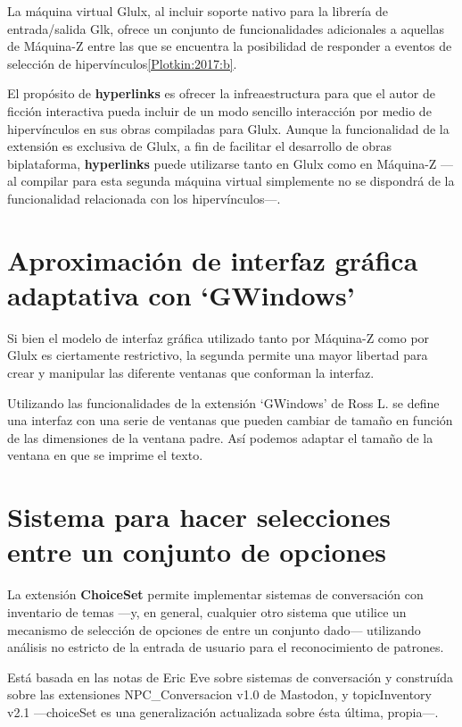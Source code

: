 La máquina virtual Glulx, al incluir soporte nativo para la librería de entrada/salida Glk, ofrece un conjunto de funcionalidades adicionales a aquellas de Máquina-Z entre las que se encuentra la posibilidad de responder a eventos de selección de hipervínculos\ref{Plotkin:2017:b}.

El propósito de \textbf{hyperlinks} es ofrecer la infreaestructura para que el autor de ficción interactiva pueda incluir de un modo sencillo interacción por medio de hipervínculos en sus obras compiladas para Glulx. Aunque la funcionalidad de la extensión es exclusiva de Glulx, a fin de facilitar el desarrollo de obras biplataforma, \textbf{hyperlinks} puede utilizarse tanto en Glulx como en Máquina-Z ---al compilar para esta segunda máquina virtual simplemente no se dispondrá de la funcionalidad relacionada con los hipervínculos---.


\section{Aproximación de interfaz gráfica adaptativa con `GWindows'}

Si bien el modelo de interfaz gráfica utilizado tanto por Máquina-Z como por Glulx es ciertamente restrictivo, la segunda permite una mayor libertad para crear y manipular las diferente ventanas que conforman la interfaz.

Utilizando las funcionalidades de la extensión `GWindows' de Ross L. se define una interfaz con una serie de ventanas que pueden cambiar de tamaño en función de las dimensiones de la ventana padre. Así podemos adaptar el tamaño de la ventana en que se imprime el texto.


\section{Sistema para hacer selecciones entre un conjunto de opciones}

La extensión \textbf{ChoiceSet} permite implementar sistemas de conversación con inventario de temas ---y, en general, cualquier otro sistema que utilice un mecanismo de selección de opciones de entre un conjunto dado--- utilizando análisis no estricto de la entrada de usuario para el reconocimiento de patrones.

Está basada en las notas de Eric Eve sobre sistemas de conversación\cite{Eve:2008} y construída sobre las extensiones NPC\_Conversacion v1.0 de Mastodon, y topicInventory v2.1 ---choiceSet es una generalización actualizada sobre ésta última, propia---.

